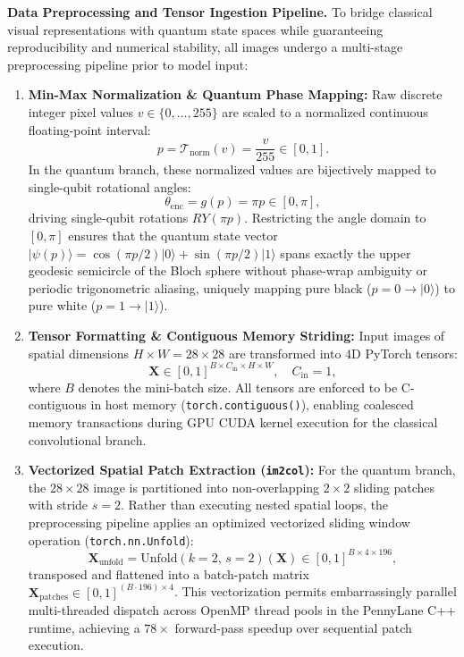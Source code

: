 \documentclass[journal]{IEEEtran}
\begin{document}
\textbf{Data Preprocessing and Tensor Ingestion Pipeline.} To bridge classical visual representations with quantum state spaces while guaranteeing reproducibility and numerical stability, all images undergo a multi-stage preprocessing pipeline prior to model input:
\begin{enumerate}
    \item \textbf{Min-Max Normalization \& Quantum Phase Mapping:} Raw discrete integer pixel values $v \in \{0, \dots, 255\}$ are scaled to a normalized continuous floating-point interval:
    \begin{equation}
    p = \mathcal{T}_{\mathrm{norm}}(v) = \frac{v}{255} \in [0, 1].
    \label{eq:pixel_normalization}
    \end{equation}
    In the quantum branch, these normalized values are bijectively mapped to single-qubit rotational angles:
    \begin{equation}
    \theta_{\mathrm{enc}} = g(p) = \pi p \in [0, \pi],
    \label{eq:angle_mapping_pi}
    \end{equation}
    driving single-qubit rotations $RY(\pi p)$. Restricting the angle domain to $[0, \pi]$ ensures that the quantum state vector $|\psi(p)\rangle = \cos(\pi p / 2)|0\rangle + \sin(\pi p / 2)|1\rangle$ spans exactly the upper geodesic semicircle of the Bloch sphere without phase-wrap ambiguity or periodic trigonometric aliasing, uniquely mapping pure black ($p=0 \to |0\rangle$) to pure white ($p=1 \to |1\rangle$).
    
    \item \textbf{Tensor Formatting \& Contiguous Memory Striding:} Input images of spatial dimensions $H \times W = 28 \times 28$ are transformed into 4D PyTorch tensors:
    \begin{equation}
    \mathbf{X} \in [0, 1]^{B \times C_{\mathrm{in}} \times H \times W}, \quad C_{\mathrm{in}} = 1,
    \label{eq:tensor_shape}
    \end{equation}
    where $B$ denotes the mini-batch size. All tensors are enforced to be C-contiguous in host memory (\texttt{torch.contiguous()}), enabling coalesced memory transactions during GPU CUDA kernel execution for the classical convolutional branch.
    
    \item \textbf{Vectorized Spatial Patch Extraction (\texttt{im2col}):} For the quantum branch, the $28 \times 28$ image is partitioned into non-overlapping $2 \times 2$ sliding patches with stride $s=2$. Rather than executing nested spatial loops, the preprocessing pipeline applies an optimized vectorized sliding window operation (\texttt{torch.nn.Unfold}):
    \begin{equation}
    \mathbf{X}_{\mathrm{unfold}} = \mathrm{Unfold}(k=2, \, s=2)(\mathbf{X}) \in [0, 1]^{B \times 4 \times 196},
    \label{eq:unfold_vectorization}
    \end{equation}
    transposed and flattened into a batch-patch matrix $\mathbf{X}_{\mathrm{patches}} \in [0, 1]^{(B \cdot 196) \times 4}$. This vectorization permits embarrassingly parallel multi-threaded dispatch across OpenMP thread pools in the PennyLane C++ runtime, achieving a $78\times$ forward-pass speedup over sequential patch execution.
    

\end{enumerate}
\end{document}
